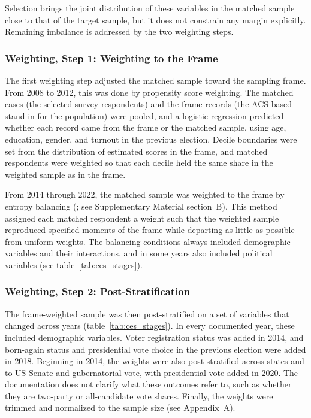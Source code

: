 \documentclass[12pt]{article}
\begin{document}
Selection brings the joint distribution of these variables in the matched sample close to that of the target sample, but it does not constrain any margin explicitly. Remaining imbalance is addressed by the two weighting steps.

\subsubsection*{Weighting, Step 1: Weighting to the Frame}
The first weighting step adjusted the matched sample toward the sampling frame. From 2008 to 2012, this was done by propensity score weighting. The matched cases (the selected survey respondents) and the frame records (the ACS-based stand-in for the population) were pooled, and a logistic regression predicted whether each record came from the frame or the matched sample, using age, education, gender, and turnout in the previous election. Decile boundaries were set from the distribution of estimated scores in the frame, and matched respondents were weighted so that each decile held the same share in the weighted sample as in the frame.
 
From 2014 through 2022, the matched sample was weighted to the frame by entropy balancing (\cite{hainmueller_entropy_2012}; see Supplementary Material section~B). This method assigned each matched respondent a weight such that the weighted sample reproduced specified moments of the frame while departing as little as possible from uniform weights. The balancing conditions always included demographic variables and their interactions, and in some years also included political variables (see table~\ref{tab:ces_stages}).

\subsubsection*{Weighting, Step 2: Post-Stratification}
The frame-weighted sample was then post-stratified on a set of variables that changed across years (table~\ref{tab:ces_stages}). In every documented year, these included demographic variables. Voter registration status was added in 2014, and born-again status and presidential vote choice in the previous election were added in 2018. Beginning in 2014, the weights were also post-stratified across states and to US Senate and gubernatorial vote, with presidential vote added in 2020. The documentation does not clarify what these outcomes refer to, such as whether they are two-party or all-candidate vote shares. Finally, the weights were trimmed and normalized to the sample size (see Appendix~A).
\end{document}
